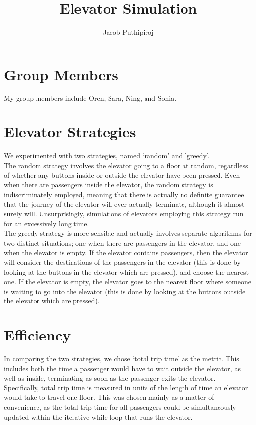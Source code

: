 \documentclass{article}
\begin{document}
\title{Elevator Simulation}
\author{Jacob Puthipiroj}
\date{}
\maketitle

\section*{Group Members}
My group members include Oren, Sara, Ning, and Sonia.

\section*{Elevator Strategies}
We experimented with two strategies, named `random' and 'greedy'.\\

The random strategy involves the elevator going to a floor at random, regardless of whether any buttons inside or outside the elevator have been pressed. Even when there are passengers inside the elevator, the random strategy is indiscriminately employed, meaning that there is actually no definite guarantee that the journey of the elevator will ever actually terminate, although it almost surely will. Unsurprisingly, simulations of elevators employing this strategy run for an excessively long time.\\

The greedy strategy is more sensible and actually involves separate algorithms for two distinct situations; one when there are passengers in the elevator, and one when the elevator is empty. If the elevator contains passengers, then the elevator will consider the destinations of the passengers in the elevator (this is done by looking at the buttons in the elevator which are pressed), and choose the nearest one. If the elevator is empty, the elevator goes to the nearest floor where someone is waiting to go into the elevator (this is done by looking at the buttons outside the elevator which are pressed).

\section*{Efficiency}
In comparing the two strategies, we chose `total trip time' as the metric. This includes both the time a passenger would have to wait outside the elevator, as well as inside, terminating as soon as the passenger exits the elevator. Specifically, total trip time is measured in units of the length of time an elevator would take to travel one floor. This was chosen mainly as a matter of convenience, as the total trip time for all passengers could be simultaneously updated within the iterative while loop that runs the elevator. \\
\end{document}
